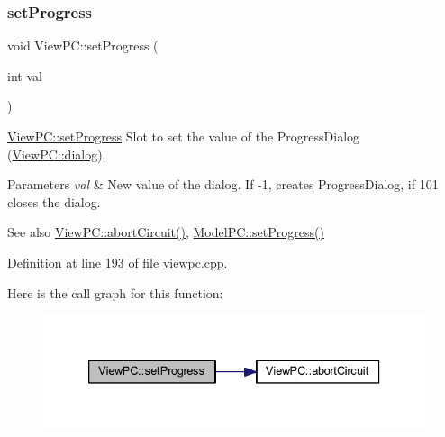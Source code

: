\subsubsection{\texorpdfstring{set\+Progress}{setProgress}}
{\footnotesize\ttfamily void View\+P\+C\+::set\+Progress (\begin{DoxyParamCaption}\item[{int}]{val }\end{DoxyParamCaption})\hspace{0.3cm}{\ttfamily [slot]}}



\mbox{\hyperlink{class_view_p_c_a9c32a1fdb6ead84e5ada8fba8860c7ed}{View\+P\+C\+::set\+Progress}} Slot to set the value of the Progress\+Dialog (\mbox{\hyperlink{class_view_p_c_a31abbb470fe329b44e6ffee202b903ca}{View\+P\+C\+::dialog}}). 


\begin{DoxyParams}{Parameters}
{\em val} & New value of the dialog. If -\/1, creates Progress\+Dialog, if 101 closes the dialog. \\
\hline
\end{DoxyParams}
\begin{DoxySeeAlso}{See also}
\mbox{\hyperlink{class_view_p_c_ad7ba2fcf1d17862de15e32432823f7b0}{View\+P\+C\+::abort\+Circuit()}}, \mbox{\hyperlink{class_model_p_c_a25a4496e129e87ac96f12257a123b84f}{Model\+P\+C\+::set\+Progress()}} 
\end{DoxySeeAlso}


Definition at line \mbox{\hyperlink{viewpc_8cpp_source_l00193}{193}} of file \mbox{\hyperlink{viewpc_8cpp_source}{viewpc.\+cpp}}.

Here is the call graph for this function\+:
\nopagebreak
\begin{figure}[H]
\begin{center}
\leavevmode
\includegraphics[width=333pt]{class_view_p_c_a9c32a1fdb6ead84e5ada8fba8860c7ed_cgraph}
\end{center}
\end{figure}
\mbox{\label{class_view_p_c_ac05220df875b7c4f24405a5742476ebf}} 
